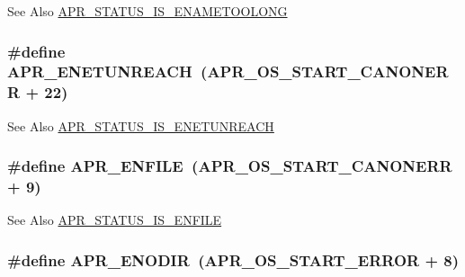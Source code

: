 \begin{DoxySeeAlso}{See Also}
\hyperlink{group___a_p_r___s_t_a_t_u_s___i_s_gad39fb68ea626722634f81a764b3626df}{A\-P\-R\-\_\-\-S\-T\-A\-T\-U\-S\-\_\-\-I\-S\-\_\-\-E\-N\-A\-M\-E\-T\-O\-O\-L\-O\-N\-G} 
\end{DoxySeeAlso}
\hypertarget{group___a_p_r___error_gab9b7124a88817d1b69cdef059f7dc689}{
\subsubsection[{A\-P\-R\-\_\-\-E\-N\-E\-T\-U\-N\-R\-E\-A\-C\-H}]{\setlength{\rightskip}{0pt plus 5cm}\#define A\-P\-R\-\_\-\-E\-N\-E\-T\-U\-N\-R\-E\-A\-C\-H~({\bf A\-P\-R\-\_\-\-O\-S\-\_\-\-S\-T\-A\-R\-T\-\_\-\-C\-A\-N\-O\-N\-E\-R\-R} + 22)}}\label{group___a_p_r___error_gab9b7124a88817d1b69cdef059f7dc689}
\begin{DoxySeeAlso}{See Also}
\hyperlink{group___a_p_r___s_t_a_t_u_s___i_s_ga19911958b3dd62559fb6c245ec579c27}{A\-P\-R\-\_\-\-S\-T\-A\-T\-U\-S\-\_\-\-I\-S\-\_\-\-E\-N\-E\-T\-U\-N\-R\-E\-A\-C\-H} 
\end{DoxySeeAlso}
\hypertarget{group___a_p_r___error_gaf46f59147b00c2c87d76b9eb75674456}{
\subsubsection[{A\-P\-R\-\_\-\-E\-N\-F\-I\-L\-E}]{\setlength{\rightskip}{0pt plus 5cm}\#define A\-P\-R\-\_\-\-E\-N\-F\-I\-L\-E~({\bf A\-P\-R\-\_\-\-O\-S\-\_\-\-S\-T\-A\-R\-T\-\_\-\-C\-A\-N\-O\-N\-E\-R\-R} + 9)}}\label{group___a_p_r___error_gaf46f59147b00c2c87d76b9eb75674456}
\begin{DoxySeeAlso}{See Also}
\hyperlink{group___a_p_r___s_t_a_t_u_s___i_s_ga4274ec4c91423ae54ab8a1d53991fb76}{A\-P\-R\-\_\-\-S\-T\-A\-T\-U\-S\-\_\-\-I\-S\-\_\-\-E\-N\-F\-I\-L\-E} 
\end{DoxySeeAlso}
\hypertarget{group___a_p_r___error_ga9a8077e85b6241c1e91b69548395fc09}{
\subsubsection[{A\-P\-R\-\_\-\-E\-N\-O\-D\-I\-R}]{\setlength{\rightskip}{0pt plus 5cm}\#define A\-P\-R\-\_\-\-E\-N\-O\-D\-I\-R~({\bf A\-P\-R\-\_\-\-O\-S\-\_\-\-S\-T\-A\-R\-T\-\_\-\-E\-R\-R\-O\-R} + 8)}}\label{group___a_p_r___error_ga9a8077e85b6241c1e91b69548395fc09}
